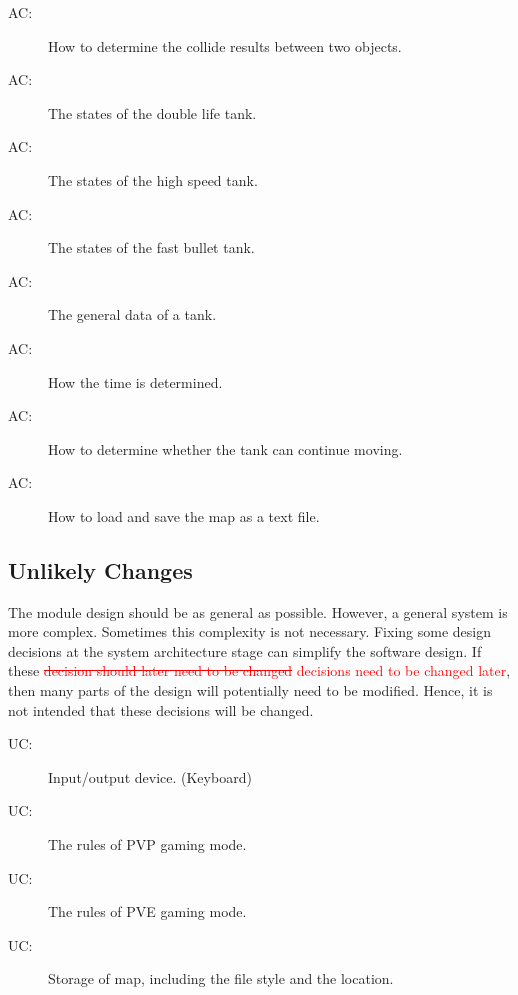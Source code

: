 \documentclass[12pt, titlepage]{article}
\newcounter{acnum}
\newcommand{\actheacnum}{AC\theacnum}
\newcounter{ucnum}
\newcommand{\uctheucnum}{UC\theucnum}
\begin{document}
\begin{description}
\item[ \actheacnum \label{collide}:] How to determine the collide results between two objects.
\item[ \actheacnum \label{StateDoubleLife}:] The states of the double life tank.
\item[ \actheacnum \label{StateHighSpeed}:] The states of the high speed tank.
\item[ \actheacnum \label{StateFastBullet}:] The states of the fast bullet tank.
\item[ \actheacnum \label{GeneralDateTank}:] The general data of a tank.
\item[ \actheacnum \label{stepCounter}:] How the time is determined.
\item[ \actheacnum \label{tankConMove}:] How to determine whether the tank can continue moving.
\item[ \actheacnum \label{loadNsaveMap}:] How to load and save the map as a text file.
\end{description}

\subsection{Unlikely Changes} \label{SecUchange}

The module design should be as general as possible. However, a general system is
more complex. Sometimes this complexity is not necessary. Fixing some design
decisions at the system architecture stage can simplify the software design. If
these \textcolor{red}{\sout{decision should later need to be changed}} \textcolor{red}{decisions need to be changed later}, then many parts of the design
will potentially need to be modified. Hence, it is not intended that these
decisions will be changed.

\begin{description}
\item[ \uctheucnum \label{InputOupt}:] Input/output device. (Keyboard)
\item[ \uctheucnum \label{RulePVP}:] The rules of PVP gaming mode.
\item[ \uctheucnum \label{RulePVE}:] The rules of PVE gaming mode.
\item[ \uctheucnum \label{MapStorage}:] Storage of map, including the file style and the location. 

\end{description}
\end{document}
